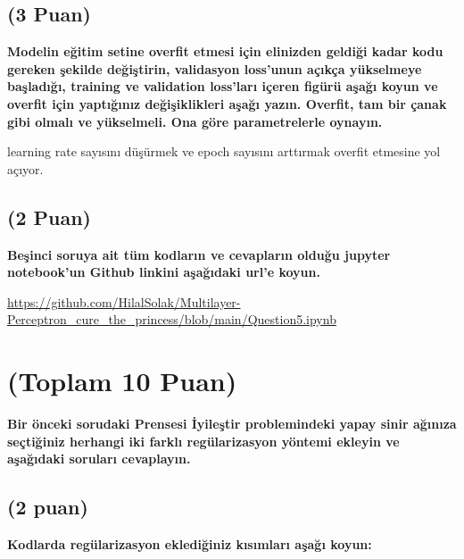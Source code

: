 \documentclass[11pt]{article}
\begin{document}
\subsection{(3 Puan)} \textbf{Modelin eğitim setine overfit etmesi için elinizden geldiği kadar kodu gereken şekilde değiştirin, validasyon loss'unun açıkça yükselmeye başladığı, training ve validation loss'ları içeren figürü aşağı koyun ve overfit için yaptığınız değişiklikleri aşağı yazın. Overfit, tam bir çanak gibi olmalı ve yükselmeli. Ona göre parametrelerle oynayın.}

learning rate sayısını düşürmek ve epoch sayısını arttırmak overfit etmesine yol açıyor.

\subsection{(2 Puan)} \textbf{Beşinci soruya ait tüm kodların ve cevapların olduğu jupyter notebook'un Github linkini aşağıdaki url'e koyun.}

\url{https://github.com/HilalSolak/Multilayer-Perceptron_cure_the_princess/blob/main/Question5.ipynb}

\section{(Toplam 10 Puan)} \textbf{Bir önceki sorudaki Prensesi İyileştir problemindeki yapay sinir ağınıza seçtiğiniz herhangi iki farklı regülarizasyon yöntemi ekleyin ve aşağıdaki soruları cevaplayın.} 

\subsection{(2 puan)} \textbf{Kodlarda regülarizasyon eklediğiniz kısımları aşağı koyun:} 
\end{document}
